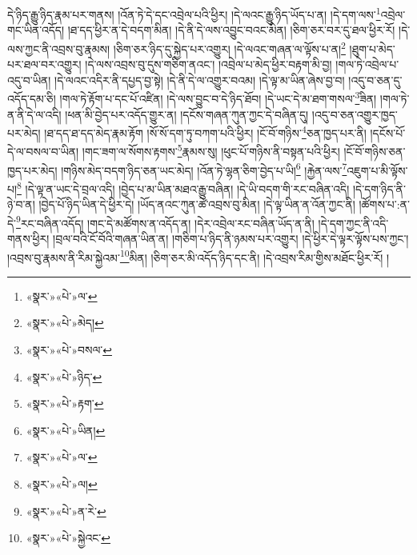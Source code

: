 དེ་ཉིད་རྒྱུ་ཉིད་རྣམ་པར་གནས། །འོན་ཏེ་དེ་དང་འབྲེལ་པའི་ཕྱིར། །དེ་ལའང་རྒྱུ་ཉིད་ཡོད་པ་ན། །དེ་དག་ལས་\footnote{«སྣར་»«པེ་»ལ་}འབྲེལ་གང་ཡིན་འདོད། །ཐ་དད་ཕྱིར་ན་དེ་བདག་མིན། །དེ་ནི་དེ་ལས་འབྱུང་བའང་མིན། །ཅིག་ཅར་བར་དུ་ཐལ་ཕྱིར་རོ། །དེ་ལས་ཀྱང་ནི་འབྲས་བུ་རྣམས། །ཅིག་ཅར་ཉིད་དུ་སྐྱེད་པར་འགྱུར། །དེ་ལའང་གཞན་ལ་ལྟོས་པ་ན།\footnote{«སྣར་»«པེ་»མེད།} །ཐུག་པ་མེད་པར་ཐལ་བར་འགྱུར། །དེ་ལས་འབྲས་བུ་དུས་གཅིག་ནའང་། །འབྲེལ་པ་མེད་ཕྱིར་བརྟག་མི་བྱ། །གལ་ཏེ་འབྲེལ་པ་འདུ་བ་ཡིན། །དེ་ལའང་འདིར་ནི་དཔྱད་བྱ་སྟེ། །དེ་ནི་དེ་ལ་འགྱུར་བའམ། །དེ་ལྟ་མ་ཡིན་ཞེས་བྱ་བ། །འདུ་བ་ཅན་དུ་འདོད་དམ་ཅི། །གལ་ཏེ་རྟོག་པ་དང་པོ་འཛིན། །དེ་ལས་བྱུང་བ་དེ་ཉིད་ཐོབ། །དེ་ཡང་དེ་མ་ཐག་གསལ་\footnote{«སྣར་»«པེ་»བསལ་}ཟིན། །གལ་ཏེ་ན་ནི་དེ་ལ་འདི། །ཕན་མི་བྱེད་པར་འདོད་གྱུར་ན། །དངོས་གཞན་ཀུན་ཀྱང་དེ་བཞིན་དུ། །འདུ་བ་ཅན་འགྱུར་ཁྱད་པར་མེད། །ཐ་དད་ཐ་དད་མེད་རྣམ་རྟོག །སོ་སོ་དག་ཏུ་བཀག་པའི་ཕྱིར། །ངོ་བོ་གཉིས་\footnote{«སྣར་»«པེ་»ཉིད་}ཅན་ཁྱད་པར་ནི། །དངོས་པོ་དེ་ལ་བསལ་བ་ཡིན། །གང་ཟག་ལ་སོགས་རྟགས་\footnote{«སྣར་»«པེ་»རྟག་}རྣམས་སུ། །ཕུང་པོ་གཉིས་ནི་བསྟན་པའི་ཕྱིར། །ངོ་བོ་གཉིས་ཅན་ཁྱད་པར་མེད། །གཉིས་མེད་བདག་ཉིད་ཅན་ཡང་མེད། །འོན་ཏེ་ལྷན་ཅིག་བྱེད་པ་ཡི།\footnote{«སྣར་»«པེ་»ཡིན།} །རྐྱེན་ལས་\footnote{«སྣར་»«པེ་»ལ་}འཇུག་པ་མི་ལྟོས་པ།\footnote{«སྣར་»«པེ་»ལ།} །དེ་ལྟ་ན་ཡང་དེ་བྲལ་འདི། །བྱེད་པ་མ་ཡིན་མཐའ་རྒྱུ་བཞིན། །དེ་ཡི་བདག་གི་རང་བཞིན་འདི། །དེ་དག་ཉིད་ནི་ཉེ་བ་ན། །བྱེད་པོ་ཉིད་ཡིན་དེ་ཕྱིར་དེ། །ཡོད་ནའང་ཀུན་ཚེ་འབྲས་བུ་མིན། །དེ་ལྟ་ཡིན་ན་འོན་ཀྱང་ནི། །ཚོགས་པ་:ན་དེ་\footnote{«སྣར་»«པེ་»ན་རེ་}རང་བཞིན་འདོད། །གང་དེ་མཚོགས་ན་འདོད་ན། །དེར་འབྲེལ་རང་བཞིན་ཡོད་ན་ནི། །དེ་དག་ཀྱང་ནི་འདི་གནས་ཕྱིར། །བྲལ་བའི་ངོ་བོའི་གཞན་ཡིན་ན། །གཅིག་པ་ཉིད་ནི་ཉམས་པར་འགྱུར། །དེ་ཕྱིར་དེ་ལྟར་ལྟོས་པས་ཀྱང་། །འབྲས་བུ་རྣམས་ནི་རིམ་སྐྱེའམ་\footnote{«སྣར་»«པེ་»སྐྱེའང་}མིན། །ཅིག་ཅར་མི་འདོད་ཉིད་དང་ནི། །དེ་འབྲས་རིམ་གྱིས་མཐོང་ཕྱིར་རོ། །
